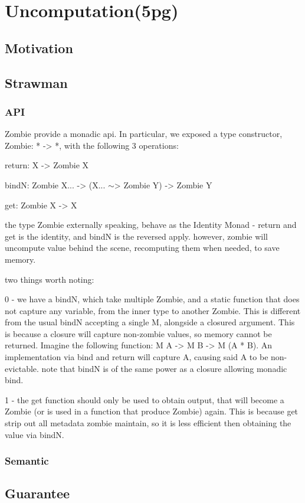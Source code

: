 \section{Uncomputation(5pg)}
\subsection{Motivation}
\subsection{Strawman}
\subsubsection{API}
Zombie provide a monadic api.
In particular, we exposed a type constructor, Zombie: * -> *,
with the following 3 operations:

return: X -> Zombie X

bindN: Zombie X... -> (X... $\sim$> Zombie Y) -> Zombie Y

get: Zombie X -> X

the type Zombie externally speaking, behave as the Identity Monad - return and get is the identity, and bindN is the reversed apply. however, zombie will uncompute value behind the scene, recomputing them when needed, to save memory.

two things worth noting:

0 - we have a bindN, which take multiple Zombie, and a static function that does not capture any variable, from the inner type to another Zombie. This is different from the usual bindN accepting a single M, alongside a closured argument. This is because a closure will capture non-zombie values, so memory cannot be returned. Imagine the following function: M A -> M B -> M (A * B). An implementation via bind and return will capture A, causing said A to be non-evictable. note that bindN is of the same power as a closure allowing monadic bind.

1 - the get function should only be used to obtain output, that will become a Zombie (or is used in a function that produce Zombie) again. This is because get strip out all metadata zombie maintain, so it is less efficient then obtaining the value via bindN.

\subsubsection{Semantic}
\subsection{Guarantee}
